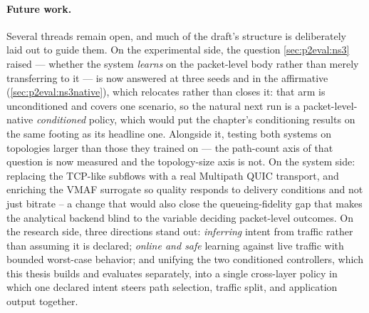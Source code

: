 \paragraph{Future work.} Several threads remain open, and much of the draft's structure is deliberately laid
out to guide them. On the experimental side, the question \cref{sec:p2eval:ns3} raised --- whether the system \emph{learns}
on the packet-level body rather than merely transferring to it --- is now answered at three seeds and in
the affirmative (\cref{sec:p2eval:ns3native}), which relocates rather than closes it: that arm is
unconditioned and covers one scenario, so the natural next run is a packet-level-native
\emph{conditioned} policy, which would put the chapter's conditioning results on the same footing as its
headline one. Alongside it,
testing both systems on topologies larger than those they trained on ---
the path-count axis of that question is now measured and the topology-size axis is not. On
the system side: replacing the TCP-like subflows with a real Multipath QUIC transport, and enriching the
VMAF surrogate so quality responds to delivery conditions and not just bitrate -- a change that would also
close the queueing-fidelity gap that makes the analytical backend blind to the variable deciding
packet-level outcomes. On the research side, three directions stand out: \emph{inferring} intent from
traffic rather than assuming it is declared; \emph{online and safe} learning against live traffic with
bounded worst-case behavior; and unifying the two conditioned controllers, which this thesis builds and
evaluates separately, into a single cross-layer policy in which one declared intent steers path
selection, traffic split, and application output together.
